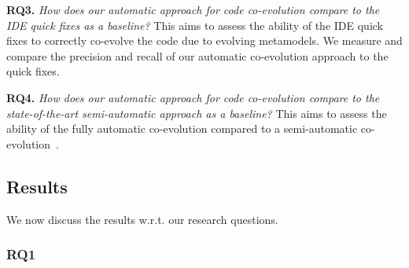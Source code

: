 	
	\textbf{RQ3.} \emph{How does our automatic approach for code co-evolution compare to the IDE quick fixes as a baseline?} 
	This aims to assess the ability of the IDE quick fixes to correctly co-evolve the code due to evolving metamodels. We measure and compare the precision and recall of our automatic co-evolution approach to the quick fixes.   
	
	\textbf{RQ4.} \emph{How does our automatic approach for code co-evolution compare to the state-of-the-art semi-automatic approach as a baseline?} 
	This aims to assess the ability of the fully automatic co-evolution compared to a semi-automatic co-evolution~\cite{Khelladi2020}. 
	
	
	

	
	
	
	\subsection{Results}
	We now discuss the results w.r.t. our research questions.
	
	\subsubsection{RQ1}
	
